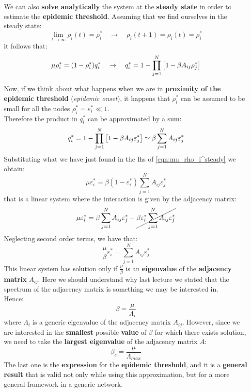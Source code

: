 \documentclass[../main/main.tex]{subfiles}
\begin{document}
We can also \textbf{solve analytically} the system at the \textbf{steady state} in order to estimate the \textbf{epidemic threshold}. Assuming that we find ourselves in the steady state:
\begin{equation*}
  \lim_{t \rightarrow \infty } \rho _i (t) = \rho _i ^* \quad \rightarrow \quad \rho _i (t+1) = \rho _i (t) = \rho _i^*
\end{equation*}
it follows that:
\begin{equation}
\label{eqn:mu_rho_i^steady}
  \mu \rho _i^* = (1- \rho _i^*) q_i^* \quad \rightarrow \quad q_i^* = 1 - \prod_{j=1}^{N} \qty[1- \beta A_{ij} \rho _j^*]
\end{equation}

Now, if we think about what happens when we are in \textbf{proximity of the epidemic threshold} (\textit{epidemic onset}), it happens that \( \rho _i^* \) can be assumed to be small for all the nodes \( \rho _i^* = \varepsilon _i^* \ll 1 \).\\
Therefore the product in \( q_i^* \) can be approximated by a sum:
\begin{equation}
  q_i^* = 1 - \prod_{j=1}^{N} \qty[1- \beta A_{ij} \varepsilon _j^*] \simeq \beta \sum_{j=1}^{N} A_{ij} \varepsilon _j^*
\end{equation}
Substituting what we have just found in the lhs of \ref{eqn:mu_rho_i^steady} we obtain:
\begin{equation}
  \mu \varepsilon _i^* = \beta (1- \varepsilon _i^*) \sum_{j=1}^{N} A_{ij} \varepsilon _{j}^*
\end{equation}
that is a linear system where the interaction is given by the adjacency matrix:
\begin{equation*}
  \mu \varepsilon _i^* = \beta \sum_{j=1}^{N} A_{ij} \varepsilon _{j}^* - \cancel{ \beta \varepsilon _i^* \sum_{j=1}^{N} A_{ij} \varepsilon _{j}^* }
\end{equation*}
Neglecting second order terms, we have that:
\begin{equation}
  \frac{\mu }{\beta } \varepsilon _i^* = \sum_{j=1}^{N} A_{ij} \varepsilon _j^*
\end{equation}
This linear system has solution only if \( \frac{\mu }{\beta } \) is an \textbf{eigenvalue} of the \textbf{adjacency matrix} \( A_{ij} \). Here we should understand why last lecture we stated that the spectrum of the adjacency matrix is something we may be interested in.\\
Hence:
\begin{equation}
  \beta = \frac{\mu }{\Lambda _i}
\end{equation}
where \( \Lambda _i \) is a generic eigenvalue of the adjacency matrix \( A_{ij} \). However, since we are interested in the \textbf{smallest} possible \textbf{value} of \( \beta  \) for which there exists solution, we need to take the \textbf{largest eigenvalue} of the adjacency matrix \( A \):
\begin{equation}
  \beta _c = \frac{\mu }{\Lambda _{max}}
\end{equation}
The last one is the \textbf{expression} for the \textbf{epidemic threshold}, and it is a \textbf{general result} that is valid not only while using this approximation, but for a more general framework in a generic network.
\end{document}
